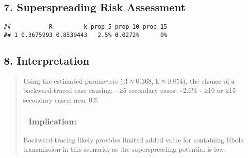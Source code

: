 \documentclass[
]{article}
\newenvironment{Shaded}{\begin{snugshade}}{\end{snugshade}}
\newcommand{\AttributeTok}[1]{\textcolor[rgb]{0.13,0.29,0.53}{#1}}
\newcommand{\CommentTok}[1]{\textcolor[rgb]{0.56,0.35,0.01}{\textit{#1}}}
\newcommand{\DecValTok}[1]{\textcolor[rgb]{0.00,0.00,0.81}{#1}}
\newcommand{\FunctionTok}[1]{\textcolor[rgb]{0.13,0.29,0.53}{\textbf{#1}}}
\newcommand{\NormalTok}[1]{#1}
\newcommand{\SpecialCharTok}[1]{\textcolor[rgb]{0.81,0.36,0.00}{\textbf{#1}}}
\newcommand{\StringTok}[1]{\textcolor[rgb]{0.31,0.60,0.02}{#1}}
\begin{document}
\subsection{7. Superspreading Risk
Assessment}\label{superspreading-risk-assessment}

\begin{Shaded}
\end{Shaded}

\begin{verbatim}
##           R         k prop_5 prop_10 prop_15
## 1 0.3675993 0.8539443   2.5% 0.0272%      0%
\end{verbatim}

\subsection{8. Interpretation}\label{interpretation}

\begin{quote}
Using the estimated parameters (R ≈ 0.368, k ≈ 0.854), the chance of a
backward-traced case causing: - ≥5 secondary cases: \textasciitilde2.6\%
- ≥10 or ≥15 secondary cases: near 0\%

\subsubsection{📌 Implication:}\label{implication}

Backward tracing likely provides limited added value for containing
Ebola transmission in this scenario, as the superspreading potential is
low.
\end{quote}
\end{document}
